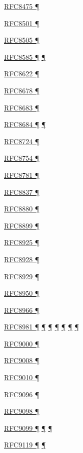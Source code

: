 \documentclass[
]{article}
\begin{document}
\hyperref[multi-prefix-operation]{RFC8475 ¶}

\hyperref[dns]{RFC8501 ¶}

\hyperref[address-resolution]{RFC8505 ¶}

\hyperref[routing]{RFC8585 ¶} \hyperref[dual-stack-scenarios]{¶}

\hyperref[traffic-class-and-flow-label]{RFC8622 ¶}

\hyperref[multi-prefix-operation]{RFC8678 ¶}

\hyperref[translation-and-ipv4-as-a-service]{RFC8683 ¶}

\hyperref[transport-protocols]{RFC8684 ¶} \hyperref[multihoming]{¶}

\hyperref[energy-consumption]{RFC8724 ¶}

\hyperref[extension-headers-and-options]{RFC8754 ¶}

\hyperref[translation-and-ipv4-as-a-service]{RFC8781 ¶}

\hyperref[traffic-class-and-flow-label]{RFC8837 ¶}

\hyperref[translation-and-ipv4-as-a-service]{RFC8880 ¶}

\hyperref[extension-headers-and-options]{RFC8899 ¶}

\hyperref[dual-stack-scenarios]{RFC8925 ¶}

\hyperref[address-resolution]{RFC8928 ¶}

\hyperref[address-resolution]{RFC8929 ¶}

\hyperref[routing]{RFC8950 ¶}

\hyperref[routing]{RFC8966 ¶}

\hyperref[addresses]{RFC8981 ¶} \hyperref[auto-configuration]{¶}
\hyperref[layer-2-considerations]{¶} \hyperref[topology-obfuscation]{¶}
\hyperref[prefix-per-host]{¶}
\hyperref[address-and-prefix-management]{¶}
\hyperref[multi-prefix-operation]{¶}

\hyperref[transport-protocols]{RFC9000 ¶}

\hyperref[routing]{RFC9008 ¶}

\hyperref[routing]{RFC9010 ¶}

\hyperref[routing]{RFC9096 ¶}

\hyperref[extension-headers-and-options]{RFC9098 ¶}

\hyperref[security]{RFC9099 ¶}
\hyperref[address-and-prefix-management]{¶}
\hyperref[security-operation]{¶}

\hyperref[address-resolution]{RFC9119 ¶} \hyperref[layer-2-functions]{¶}
\end{document}
